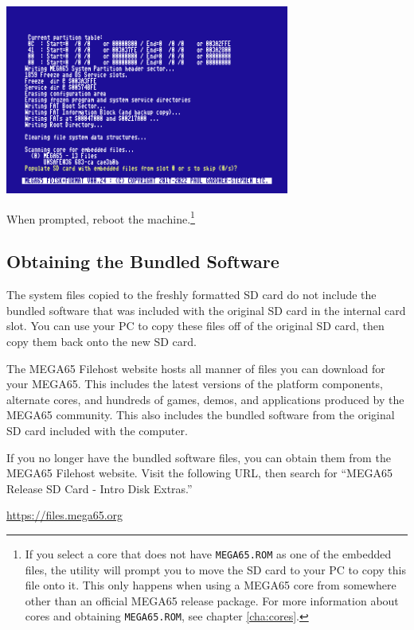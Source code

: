 \begin{center}
  \includegraphics[width=0.7\textwidth]{images/ss-m65fdisk-populate.png}
\end{center}

When prompted, reboot the machine.\footnote{If you select a core that does not have {\tt MEGA65.ROM} as one of the embedded files, the utility will prompt you to move the SD card to your PC to copy this file onto it. This only happens when using a MEGA65 core from somewhere other than an official MEGA65 release package. For more information about cores and obtaining {\tt MEGA65.ROM}, see chapter \vref{cha:cores}.}

\subsection{Obtaining the Bundled Software}

The system files copied to the freshly formatted SD card do not include the bundled software that was included with the original SD card in the internal card slot. You can use your PC to copy these files off of the original SD card, then copy them back onto the new SD card.

The MEGA65 Filehost website hosts all manner of files you can download for your MEGA65. This includes the latest versions of the platform components, alternate cores, and hundreds of games, demos, and applications produced by the MEGA65 community. This also includes the bundled software from the original SD card included with the computer.

If you no longer have the bundled software files, you can obtain them from the MEGA65 Filehost website. Visit the following URL, then search for ``MEGA65 Release SD Card - Intro Disk Extras.''

\url{https://files.mega65.org}
